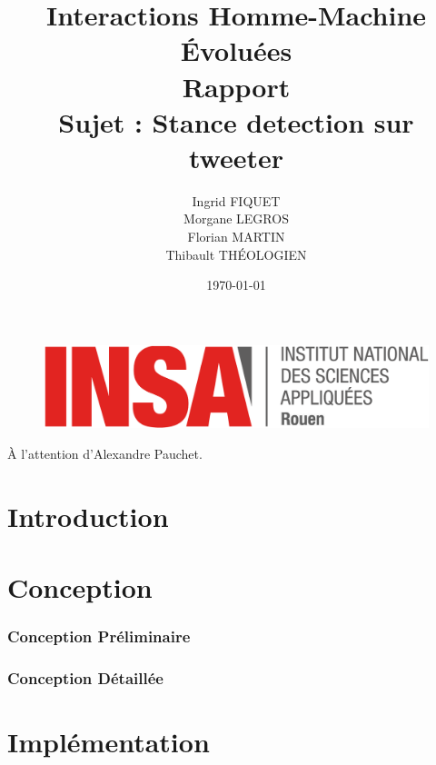 \documentclass[a4paper,12pt]{article}
\title{\huge Interactions Homme-Machine Évoluées\\Rapport\\Sujet : Stance detection sur tweeter}
\author{Ingrid FIQUET\\Morgane LEGROS\\Florian MARTIN\\Thibault THÉOLOGIEN}
\date{\today}
\begin{document}
	\begin{titlepage}
		\vfill
		\begin{figure}
			\includegraphics[scale=0.3]{img/logo_insa_rouen.png}
		\end{figure}

		\maketitle


    \begin{center}
    \LARGE
      \addvspace{10mm}
      À l'attention d'Alexandre Pauchet.
    \end{center}

		\vfill
		\noindent \hrulefill

	\end{titlepage}



\newpage
\tableofcontents{}

\newpage
\part{Introduction}
	
	\newpage

\part{Conception}

\section{Conception Préliminaire}
	
	\newpage


\section{Conception Détaillée}
	
	\newpage


\newpage
\part{Implémentation}
	
	\newpage
\end{document}

